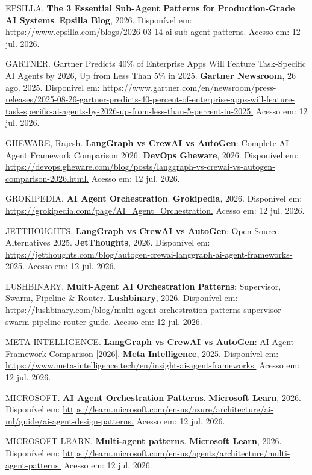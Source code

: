 \documentclass[12pt,a4paper]{article}
\begin{document}
EPSILLA. \textbf{The 3 Essential Sub-Agent Patterns for Production-Grade AI Systems}. \textbf{Epsilla Blog}, 2026. Disponível em: \url{https://www.epsilla.com/blogs/2026-03-14-ai-sub-agent-patterns.} Acesso em: 12 jul. 2026.

GARTNER. Gartner Predicts 40\% of Enterprise Apps Will Feature Task-Specific AI Agents by 2026, Up from Less Than 5\% in 2025. \textbf{Gartner Newsroom}, 26 ago. 2025. Disponível em: \url{https://www.gartner.com/en/newsroom/press-releases/2025-08-26-gartner-predicts-40-percent-of-enterprise-apps-will-feature-task-specific-ai-agents-by-2026-up-from-less-than-5-percent-in-2025.} Acesso em: 12 jul. 2026.

GHEWARE, Rajesh. \textbf{LangGraph vs CrewAI vs AutoGen}: Complete AI Agent Framework Comparison 2026. \textbf{DevOps Gheware}, 2026. Disponível em: \url{https://devops.gheware.com/blog/posts/langgraph-vs-crewai-vs-autogen-comparison-2026.html.} Acesso em: 12 jul. 2026.

GROKIPEDIA. \textbf{AI Agent Orchestration}. \textbf{Grokipedia}, 2026. Disponível em: \url{https://grokipedia.com/page/AI\_Agent\_Orchestration.} Acesso em: 12 jul. 2026.

JETTHOUGHTS. \textbf{LangGraph vs CrewAI vs AutoGen}: Open Source Alternatives 2025. \textbf{JetThoughts}, 2026. Disponível em: \url{https://jetthoughts.com/blog/autogen-crewai-langgraph-ai-agent-frameworks-2025.} Acesso em: 12 jul. 2026.

LUSHBINARY. \textbf{Multi-Agent AI Orchestration Patterns}: Supervisor, Swarm, Pipeline \& Router. \textbf{Lushbinary}, 2026. Disponível em: \url{https://lushbinary.com/blog/multi-agent-orchestration-patterns-supervisor-swarm-pipeline-router-guide.} Acesso em: 12 jul. 2026.

META INTELLIGENCE. \textbf{LangGraph vs CrewAI vs AutoGen}: AI Agent Framework Comparison [2026]. \textbf{Meta Intelligence}, 2025. Disponível em: \url{https://www.meta-intelligence.tech/en/insight-ai-agent-frameworks.} Acesso em: 12 jul. 2026.

MICROSOFT. \textbf{AI Agent Orchestration Patterns}. \textbf{Microsoft Learn}, 2026. Disponível em: \url{https://learn.microsoft.com/en-us/azure/architecture/ai-ml/guide/ai-agent-design-patterns.} Acesso em: 12 jul. 2026.

MICROSOFT LEARN. \textbf{Multi-agent patterns}. \textbf{Microsoft Learn}, 2026. Disponível em: \url{https://learn.microsoft.com/en-us/agents/architecture/multi-agent-patterns.} Acesso em: 12 jul. 2026.
\end{document}

